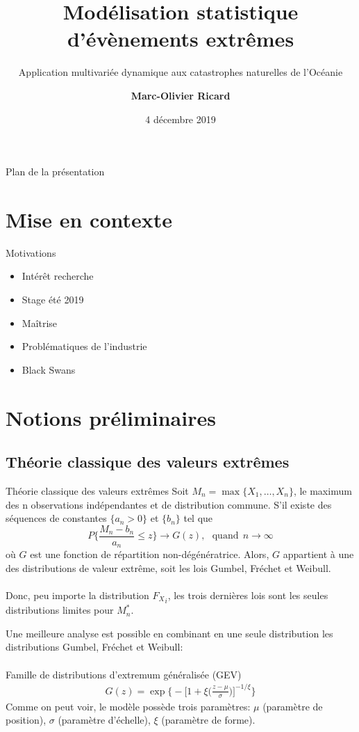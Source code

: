 \documentclass[aspectratio=169, 12pt, french]{beamer}
\title[\hyperlink{start}{ACT-2101}]{\huge Modélisation statistique d'évènements extrêmes}
\subtitle{\large Application multivariée dynamique aux catastrophes naturelles de l'Océanie}
\author{\Large \textbf{Marc-Olivier Ricard}}
\institute{\large Sous la supervision de \\ Marie-Pier Côté}
\date{\large 4 décembre 2019}
\begin{document}
\begin{frame}
\titlepage
\end{frame}


\begin{frame}{Plan de la présentation}
\tableofcontents
\end{frame}

\section{Mise en contexte}



\begingroup
\large
\begin{frame}{Motivations}
\begin{itemize}
	\item Intérêt recherche
	\item Stage été 2019
	\item Maîtrise
	\item Problématiques de l'industrie
	\item Black Swans
\end{itemize}
\end{frame}
\endgroup


\section{Notions préliminaires}

\subsection{Théorie classique des valeurs extrêmes}
\begin{frame}{Théorie classique des valeurs extrêmes}
Soit $M_n = \max\{X_1, \dots, X_n\}$, le maximum des n observations indépendantes et de distribution commune. 
S'il existe des séquences de constantes $\{a_n > 0\}$ et $\{b_n\}$ tel que $$P\Bigg\{\frac{M_n - b_n}{a_n} \le z \Bigg\}\to G(z), \ \ \  \text{quand} \ \ {n \to \infty}$$ où $G$ est une fonction de répartition non-dégénératrice. Alors, $G$ appartient à une des distributions de valeur extrême, soit les lois Gumbel, Fréchet et Weibull. \\~\\
Donc, peu importe la distribution ${F_X}_i$, les trois dernières lois sont les seules distributions limites pour $M^*_n$.
\end{frame}

\begin{frame}
Une meilleure analyse est possible en combinant en une seule distribution les distributions Gumbel, Fréchet et Weibull:\\~\\
Famille de distributions d'extremum généralisée (GEV)
\begin{equation}
\begin{gathered}
G(z) = \exp \Bigg\{ - \Big[ 1 +\xi\Big(\frac{z-\mu}{\sigma}\Big) \Big]^{-1/\xi}  \Bigg\}
\end{gathered}
\end{equation} 
Comme on peut voir, le modèle possède trois paramètres: $\mu$ (paramètre de position), $\sigma$ (paramètre d'échelle), $\xi$ (paramètre de forme).
\end{frame}
\end{document}
